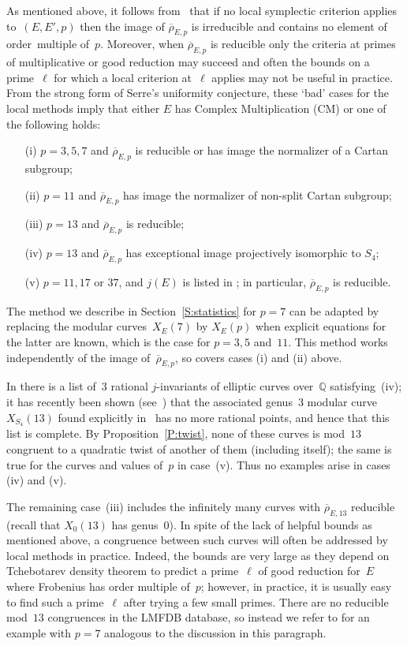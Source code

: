 \documentclass[12pt, reqno]{amsart}
\newcommand{\Q}{\mathbb{Q}}
\newcommand{\rhobar}{{\overline{\rho}}}
\numberwithin{equation}{section}
\theoremstyle{definition}
\theoremstyle{remark}
\begin{document}
As mentioned above, it follows from~\cite{FKSym} 
that if no local symplectic criterion
applies to~$(E,E',p)$ then the image of $\rhobar_{E,p}$ is irreducible and contains no element of order~multiple of~$p$. Moreover, 
when $\rhobar_{E,p}$ is reducible only the criteria at primes of multiplicative or good reduction may succeed and often the bounds
on a prime~$\ell$ for which a local criterion at~$\ell$ 
applies may not be useful in practice.
From the strong form of Serre's uniformity conjecture, these `bad'
cases for the local methods imply that either $E$ has Complex
Multiplication (CM) 
or one of the following holds:
\begin{itemize}
 \item[(i)] $p=3,5,7$ and $\rhobar_{E,p}$ is reducible or has image the normalizer of a Cartan subgroup;
 \item[(ii)] $p=11$ and $\rhobar_{E,p}$ has image the normalizer of non-split Cartan subgroup;
 \item[(iii)] $p=13$ and $\rhobar_{E,p}$ is reducible; 
 \item[(iv)] $p=13$ and $\rhobar_{E,p}$ has exceptional image projectively isomorphic to $S_4$;
 \item[(v)] $p=11,17$ or $37$, and $j(E)$ is listed
 in \cite[Table~2.1]{DahmenPhD}; in particular, $\rhobar_{E,p}$ is reducible.
\end{itemize}
The method we describe in Section~\ref{S:statistics} for $p=7$ can be
adapted by replacing the modular curves~$X_E(7)$ by $X_E(p)$ when
explicit equations for the latter are known, which is the case for
$p=3,5$ and~$11$. This method works independently of the image
of~$\rhobar_{E,p}$, so covers cases (i) and (ii) above.

In \cite[Corollary~1.9]{BarinderCrem} there is a list of~$3$ rational
$j$-invariants of elliptic curves over~$\Q$ satisfying~(iv); it has
recently been shown (see~\cite{BDMTV-S4}) that the associated
genus~$3$ modular curve~$X_{S_4}(13)$ found explicitly
in~\cite{BarinderCrem} has no more rational points, and hence that
this list is complete. By Proposition~\ref{P:twist}, none of these
curves is mod~$13$ congruent to a quadratic twist of another of them
(including itself); the same is true for the curves and values of~$p$
in case~(v). Thus no examples arise in cases (iv) and (v).

The remaining case~(iii) includes the infinitely many curves with
$\rhobar_{E,13}$ reducible (recall that $X_0(13)$ has genus~0). In
spite of the lack of helpful bounds as mentioned above, a congruence
between such curves will often be addressed by local methods in
practice. Indeed, the bounds are very large as they depend on
Tchebotarev density theorem to predict a prime~$\ell$ of good
reduction for~$E$ where Frobenius has order multiple of~$p$; however,
in practice, it is usually easy to find such a prime~$\ell$ after
trying a few small primes.  There are no reducible mod~$13$ congruences in the LMFDB database, so instead we refer to \cite[Example~31.2]{FKSym} for
an example with $p=7$ analogous to the discussion in this paragraph.
\end{document}
